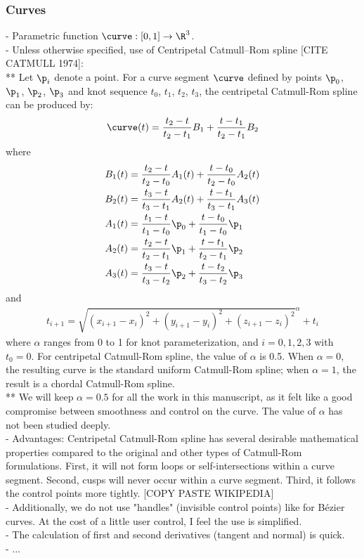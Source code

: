 \subsubsection{Curves}
- Parametric function $\curve: [0, 1] \to \R^3$. \\
- Unless otherwise specified, use of Centripetal Catmull–Rom spline [CITE CATMULL 1974]: \\
** Let $\p_i$ denote a point. For a curve segment $\curve$ defined by points $\p_0$, $\p_1$, $\p_2$, $\p_3$ and knot sequence $t_0$, $t_1$, $t_2$, $t_3$, the centripetal Catmull-Rom spline can be produced by:
\begin{align}
    \curve(t) = \frac{t_2 - t}{t_2 - t_1} B_1 + \frac{t - t_1}{t_2 - t_1} B_2
\end{align}
where
\begin{align}
    B_1(t) &= \frac {t_2 - t}{t_2 - t_0} A_1(t) + \frac{t - t_0}{t_2 - t_0} A_2(t) \\
    B_2(t) &= \frac{t_3 - t}{t_3 - t_1} A_2(t) + \frac{t - t_1}{t_3 - t_1} A_3(t) \\
    A_1(t) &= \frac{t_1 - t}{t_1 - t_0} \p_0 + \frac{t - t_0}{t_1 - t_0} \p_1 \\
    A_2(t) &= \frac{t_2 - t}{t_2 - t_1} \p_1 + \frac{t - t_1}{t_2 - t_1} \p_2 \\
    A_3(t) &= \frac{t_3 - t}{t_3 - t_2} \p_2 + \frac{t - t_2}{t_3 - t_2} \p_3
\end{align}
and
\begin{align}
    t_{i + 1} = \sqrt{ \left(x_{i+1} - x_i \right)^2 + \left(y_{i+1} - y_i \right)^2 +  \left(z_{i+1} - z_i \right)^2 }^\alpha + t_i
\end{align}
where $\alpha$ ranges from 0 to 1 for knot parameterization, and $i = 0, 1, 2, 3$ with $t_0 = 0$. For centripetal Catmull-Rom spline, the value of $\alpha$ is 
0.5. When $\alpha = 0$, the resulting curve is the standard uniform Catmull-Rom spline; when $\alpha = 1$, the result is a chordal Catmull-Rom spline. \\
** We will keep $\alpha = 0.5$ for all the work in this manuscript, as it felt like a good compromise between smoothness and control on the curve. The value of $\alpha$ has not been studied deeply. \\
- Advantages: Centripetal Catmull-Rom spline has several desirable mathematical properties compared to the original and other types of Catmull-Rom formulations. First, it will not form loops or self-intersections within a curve segment. Second, cusps will never occur within a curve segment. Third, it follows the control points more tightly. [COPY PASTE WIKIPEDIA] \\
- Additionally, we do not use "handles" (invisible control points) like for Bézier curves. At the cost of a little user control, I feel the use is simplified. \\
- The calculation of first and second derivatives (tangent and normal) is quick. \\
- ...

